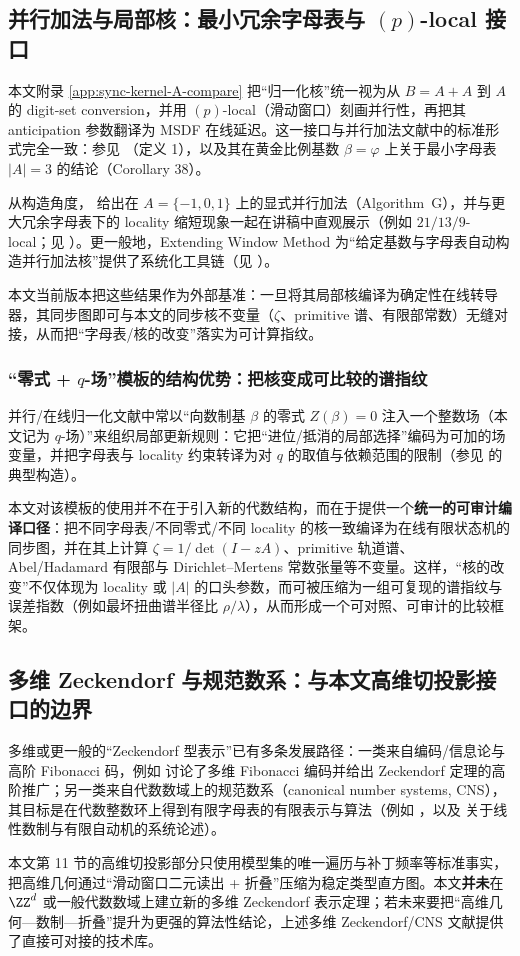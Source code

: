 \subsection{并行加法与局部核：最小冗余字母表与 \texorpdfstring{$(p)$}{p}-local 接口}
本文附录 \ref{app:sync-kernel-A-compare} 把“归一化核”统一视为从 $B=A{+}A$ 到 $A$ 的 digit-set conversion，并用 $(p)$-local（滑动窗口）刻画并行性，再把其 anticipation 参数翻译为 MSDF 在线延迟。这一接口与并行加法文献中的标准形式完全一致：参见 \cite{FrougnyPelantovaSvobodova2013MinimalDigitSets}（定义 1），以及其在黄金比例基数 $\beta=\varphi$ 上关于最小字母表 $|A|=3$ 的结论（Corollary 38）。

从构造角度，\cite{FrougnyHellerPelantovaSvobodovaParallelAlgorithmsSlides} 给出在 $A=\{-1,0,1\}$ 上的显式并行加法（Algorithm~G），并与更大冗余字母表下的 locality 缩短现象一起在讲稿中直观展示（例如 $21/13/9$-local；见 \cite{Frougny2012NumbersAsStreamsLeiden}）。更一般地，Extending Window Method 为“给定基数与字母表自动构造并行加法核”提供了系统化工具链（见 \cite{LegerskySvobodova2018EWM}）。

本文当前版本把这些结果作为外部基准：一旦将其局部核编译为确定性在线转导器，其同步图即可与本文的同步核不变量（$\zeta$、primitive 谱、有限部常数）无缝对接，从而把“字母表/核的改变”落实为可计算指纹。

\subsubsection{“零式 + \texorpdfstring{$q$}{q}-场”模板的结构优势：把核变成可比较的谱指纹}
并行/在线归一化文献中常以“向数制基 $\beta$ 的零式 $Z(\beta)=0$ 注入一个整数场（本文记为 $q$-场）”来组织局部更新规则：它把“进位/抵消的局部选择”编码为可加的场变量，并把字母表与 locality 约束转译为对 $q$ 的取值与依赖范围的限制（参见 \cite{FrougnyHellerPelantovaSvobodovaParallelAlgorithmsSlides,LegerskySvobodova2018EWM} 的典型构造）。

本文对该模板的使用并不在于引入新的代数结构，而在于提供一个\textbf{统一的可审计编译口径}：把不同字母表/不同零式/不同 locality 的核一致编译为在线有限状态机的同步图，并在其上计算 $\zeta=1/\det(I-zA)$、primitive 轨道谱、Abel/Hadamard 有限部与 Dirichlet--Mertens 常数张量等不变量。这样，“核的改变”不仅体现为 locality 或 $|A|$ 的口头参数，而可被压缩为一组可复现的谱指纹与误差指数（例如最坏扭曲谱半径比 $\rho/\lambda$），从而形成一个可对照、可审计的比较框架。

\subsection{多维 Zeckendorf 与规范数系：与本文高维切投影接口的边界}
多维或更一般的“Zeckendorf 型表示”已有多条发展路径：一类来自编码/信息论与高阶 Fibonacci 码，例如 \cite{PooksombatUdomkavanichKositwattanarerk2020MultidimFibonacciCoding} 讨论了多维 Fibonacci 编码并给出 Zeckendorf 定理的高阶推广；另一类来自代数数域上的规范数系（canonical number systems, CNS），其目标是在代数整数环上得到有限字母表的有限表示与算法（例如 \cite{KataiSzabo1975CNS}，以及 \cite{Frougny1992NumbersAutomata} 关于线性数制与有限自动机的系统论述）。

本文第 11 节的高维切投影部分只使用模型集的唯一遍历与补丁频率等标准事实，把高维几何通过“滑动窗口二元读出 + 折叠”压缩为稳定类型直方图。本文\textbf{并未}在 $\ZZ^d$ 或一般代数数域上建立新的多维 Zeckendorf 表示定理；若未来要把“高维几何—数制—折叠”提升为更强的算法性结论，上述多维 Zeckendorf/CNS 文献提供了直接可对接的技术库。
